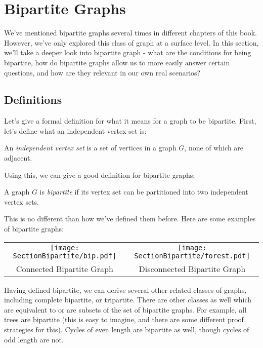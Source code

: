 \section{Bipartite Graphs}
We've mentioned bipartite graphs several times in different chapters of this book. However, we've only explored this class of graph at a surface level. In this section, we'll take a deeper look into bipartite graph - what are the conditions for being bipartite, how do bipartite graphs allow us to more easily answer certain questions, and how are they relevant in our own real scenarios?

\subsection{Definitions}
Let's give a formal definition for what it means for a graph to be bipartite. First, let's define what an independent vertex set is:

\begin{definition}
    An \textit{independent vertex set} is a set of vertices in a graph $G$, none of which are adjacent.
\end{definition}

Using this, we can give a good definition for bipartite graphs:

\begin{definition}
    A graph $G$ is \textit{bipartite} if its vertex set can be partitioned into two independent vertex sets.
\end{definition}

This is no different than how we've defined them before. Here are some examples of bipartite graphs:

\begin{center}
    \begin{tabular}{c c}
        \texttt{[image: SectionBipartite/bip.pdf]} & \texttt{[image: SectionBipartite/forest.pdf]} \\
        Connected Bipartite Graph & Disconnected Bipartite Graph
    \end{tabular}
\end{center}

Having defined bipartite, we can derive several other related classes of graphs, including complete bipartite, or tripartite. There are other classes as well which are equivalent to or are subsets of the set of bipartite graphs. For example, all trees are bipartite (this is easy to imagine, and there are some different proof strategies for this). Cycles of even length are bipartite as well, though cycles of odd length are not. 

